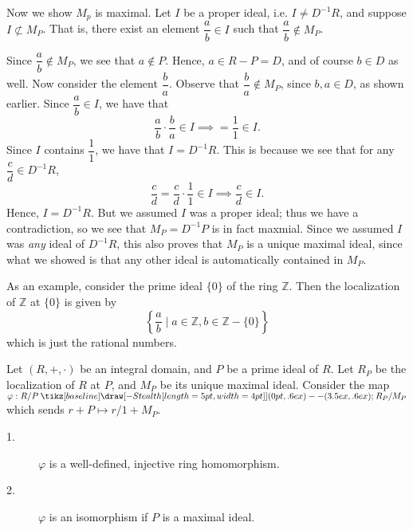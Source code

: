 \documentclass[12pt,letterpaper]{algebra_book}
\renewcommand{\to}{\mathbin{\tikz[baseline] \draw[-{Stealth[length=5pt,width=4pt]}] (0pt,.6ex) -- (3.5ex,.6ex);}}
\newcommand{\ZZ}{\mathbb{Z}}
\renewcommand{\phi}{\varphi}
\theoremstyle{definition}
\begin{document}
\begin{prf}
\begin{description}
        Now we show $M_p$ is maximal. Let $I$ be a proper ideal, i.e. $I
        \ne D^{-1}R$, and suppose $I
        \not\subset M_P$. That is, there exist an element
        $\dfrac{a}{b} \in I$ such that $\dfrac{a}{b} \not\in M_P$.
        
        Since $\dfrac{a}{b} \not\in M_P$, we see that $a \not\in P$.
        Hence, $a \in R - P = D$, and of course $b \in D$ as well. Now
        consider the element $\dfrac{b}{a}$. Observe that
        $\dfrac{b}{a} \not\in M_P$, since $b, a \in D$, as shown
        earlier. Since $\dfrac{a}{b} \in I$, we have that 
        \[
            \dfrac{a}{b}\cdot \dfrac{b}{a} \in I \implies = \dfrac{1}{1} \in I.
        \]
        Since $I$ contains $\dfrac{1}{1}$, we have that $I = D^{-1}R$.
        This is because we see that for any
        $\dfrac{c}{d} \in D^{-1}R$, 
        \[
            \dfrac{c}{d} =\dfrac{c}{d}\cdot\dfrac{1}{1} \in I \implies \dfrac{c}{d} \in I.
        \]
        Hence, $I = D^{-1}R$. But we assumed $I$ was a proper ideal; thus we
        have a contradiction, so we see that $M_P = D^{-1}P$ is in fact maxmial.
        Since we assumed $I$ was \textit{any} ideal of $D^{-1}R$, this
        also proves that $M_P$ is a unique maximal ideal, since what we
        showed is that any other ideal is automatically contained in
        $M_P$. 
    \end{description}
\end{prf}

As an example, consider the prime ideal $\{0\}$ of the ring
$\mathbb{Z}$. Then the localization of $\mathbb{Z}$ at $\{0\}$ is
given by 
\[
    \left\{ \dfrac{a}{b} \mid a \in \ZZ, b \in \ZZ - \{0\}  \right\}
\]
which is just the rational numbers. 

\begin{thm}
    Let $(R, +, \cdot)$ be an integral domain, and $P$ be a prime
    ideal of $R$. Let $R_P$ be the localization of $R$ at $P$, and
    $M_P$ be its unique maximal ideal. Consider the map $\phi: R/P
    \to R_P/M_P$ which sends $r + P \mapsto r/1 + M_P$. 
    \begin{description}
        \item[1.] $\phi$ is a well-defined, injective ring
        homomorphism. 
        \item[2.] $\phi$ is an isomorphism if $P$ is a
        maximal ideal. 
    \end{description}
\end{thm}
\end{document}
